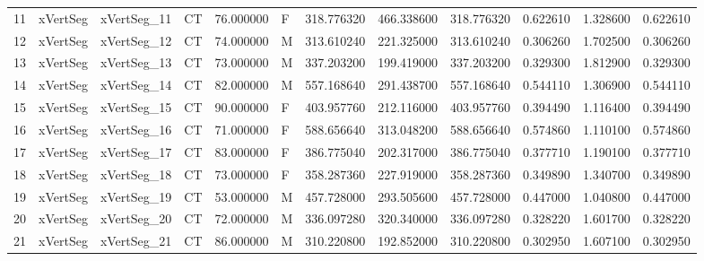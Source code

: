 \begin{tabular}{llllrlrrrrrr}
11     &        xVertSeg &  xVertSeg\_11 &                 CT &  76.000000 &        F &       318.776320 &    466.338600 &  318.776320 &               0.622610 &            1.328600 &          0.622610 \\
12     &        xVertSeg &  xVertSeg\_12 &                 CT &  74.000000 &        M &       313.610240 &    221.325000 &  313.610240 &               0.306260 &            1.702500 &          0.306260 \\
13     &        xVertSeg &  xVertSeg\_13 &                 CT &  73.000000 &        M &       337.203200 &    199.419000 &  337.203200 &               0.329300 &            1.812900 &          0.329300 \\
14     &        xVertSeg &  xVertSeg\_14 &                 CT &  82.000000 &        M &       557.168640 &    291.438700 &  557.168640 &               0.544110 &            1.306900 &          0.544110 \\
15     &        xVertSeg &  xVertSeg\_15 &                 CT &  90.000000 &        F &       403.957760 &    212.116000 &  403.957760 &               0.394490 &            1.116400 &          0.394490 \\
16     &        xVertSeg &  xVertSeg\_16 &                 CT &  71.000000 &        F &       588.656640 &    313.048200 &  588.656640 &               0.574860 &            1.110100 &          0.574860 \\
17     &        xVertSeg &  xVertSeg\_17 &                 CT &  83.000000 &        F &       386.775040 &    202.317000 &  386.775040 &               0.377710 &            1.190100 &          0.377710 \\
18     &        xVertSeg &  xVertSeg\_18 &                 CT &  73.000000 &        F &       358.287360 &    227.919000 &  358.287360 &               0.349890 &            1.340700 &          0.349890 \\
19     &        xVertSeg &  xVertSeg\_19 &                 CT &  53.000000 &        M &       457.728000 &    293.505600 &  457.728000 &               0.447000 &            1.040800 &          0.447000 \\
20     &        xVertSeg &  xVertSeg\_20 &                 CT &  72.000000 &        M &       336.097280 &    320.340000 &  336.097280 &               0.328220 &            1.601700 &          0.328220 \\
21     &        xVertSeg &  xVertSeg\_21 &                 CT &  86.000000 &        M &       310.220800 &    192.852000 &  310.220800 &               0.302950 &            1.607100 &          0.302950 \\

\end{tabular}
